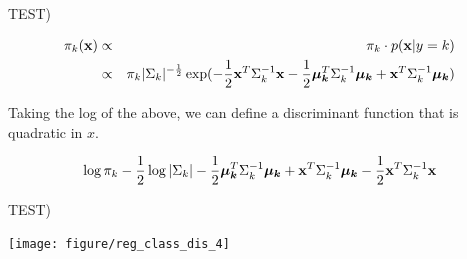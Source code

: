 \documentclass[11pt,compress,t,notes=noshow, xcolor=table]{beamer}
\begin{document}
\begin{vbframe}{TEST)}

\begin{eqnarray*}
\pi_{k}(\mathbf{x}) &\propto& \pi_{k} \cdot p(\mathbf{x} | y= k) \\
&\propto& \pi_{k} |\Sigma_k|^{-\frac{1}{2}}\exp(- \frac{1}{2} \mathbf{x}^T\Sigma_k^{-1}\mathbf{x} - \frac{1}{2} \bm{\mu_{k}}^T \Sigma_k^{-1} \bm{\mu_{k}} + \mathbf{x}^T \Sigma_k^{-1} \bm{\mu_{k}} )
\end{eqnarray*}

Taking the log of the above, we can define a discriminant function that is quadratic in $x$.

$$
\log \pi_{k} - \frac{1}{2} \log |\Sigma_k| - \frac{1}{2} \bm{\mu_{k}}^T \Sigma_k^{-1} \bm{\mu_{k}} + \mathbf{x}^T \Sigma_k^{-1} \bm{\mu_{k}} - \frac{1}{2} \mathbf{x}^T\Sigma_k^{-1}\mathbf{x} $$









\end{vbframe}
\begin{vbframe}{TEST)}

\begin{knitrout}\scriptsize
{}\color{fgcolor}

{\centering \texttt{[image: figure/reg\_class\_dis\_4]} 

}



\end{knitrout}

\end{vbframe}
\endlecture
\end{document}
